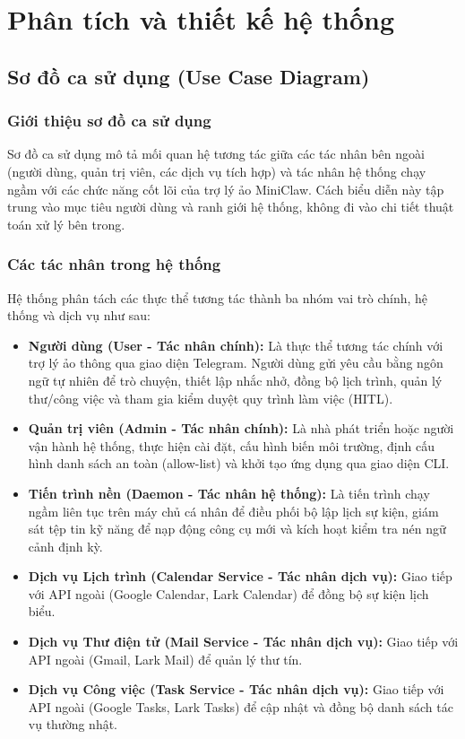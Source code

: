 \chapter{Phân tích và thiết kế hệ thống}
\label{chap:analysis-design}

\section{Sơ đồ ca sử dụng (Use Case Diagram)}
\subsection{Giới thiệu sơ đồ ca sử dụng}
Sơ đồ ca sử dụng mô tả mối quan hệ tương tác giữa các tác nhân bên ngoài (người dùng, quản trị viên, các dịch vụ tích hợp) và tác nhân hệ thống chạy ngầm với các chức năng cốt lõi của trợ lý ảo MiniClaw. Cách biểu diễn này tập trung vào mục tiêu người dùng và ranh giới hệ thống, không đi vào chi tiết thuật toán xử lý bên trong.

\subsection{Các tác nhân trong hệ thống}
Hệ thống phân tách các thực thể tương tác thành ba nhóm vai trò chính, hệ thống và dịch vụ như sau:
\begin{itemize}
  \item \textbf{Người dùng (User - Tác nhân chính):} Là thực thể tương tác chính với trợ lý ảo thông qua giao diện Telegram. Người dùng gửi yêu cầu bằng ngôn ngữ tự nhiên để trò chuyện, thiết lập nhắc nhở, đồng bộ lịch trình, quản lý thư/công việc và tham gia kiểm duyệt quy trình làm việc (HITL).
  \item \textbf{Quản trị viên (Admin - Tác nhân chính):} Là nhà phát triển hoặc người vận hành hệ thống, thực hiện cài đặt, cấu hình biến môi trường, định cấu hình danh sách an toàn (allow-list) và khởi tạo ứng dụng qua giao diện CLI.
  \item \textbf{Tiến trình nền (Daemon - Tác nhân hệ thống):} Là tiến trình chạy ngầm liên tục trên máy chủ cá nhân để điều phối bộ lập lịch sự kiện, giám sát tệp tin kỹ năng để nạp động công cụ mới và kích hoạt kiểm tra nén ngữ cảnh định kỳ.
  \item \textbf{Dịch vụ Lịch trình (Calendar Service - Tác nhân dịch vụ):} Giao tiếp với API ngoài (Google Calendar, Lark Calendar) để đồng bộ sự kiện lịch biểu.
  \item \textbf{Dịch vụ Thư điện tử (Mail Service - Tác nhân dịch vụ):} Giao tiếp với API ngoài (Gmail, Lark Mail) để quản lý thư tín.
  \item \textbf{Dịch vụ Công việc (Task Service - Tác nhân dịch vụ):} Giao tiếp với API ngoài (Google Tasks, Lark Tasks) để cập nhật và đồng bộ danh sách tác vụ thường nhật.
\end{itemize}

